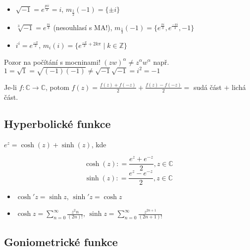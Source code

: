 \begin{example}
\begin{itemize}
    \item $\sqrt{-1}=e^{\frac{pi i}{2}}=i$,  $m_{\frac{1}{2}}(-1)=\{\pm i\}$
    \item $\sqrt[3]{-1}=e^{\frac{\pi i}{3}}$ (nesouhlasí s MA!),  $m_{\frac{1}{3}}(-1)=\{e^{\frac{\pi i}{3}},e^{\frac{-\pi i}{3}},-1\} $
    \item  $i^i=e^{\frac{-\pi }{2}}$, 
    $m_{i}(i)=\{e^{\frac{-\pi }{2}+2k\pi}\mid k\in\mathbb{Z}\}$
\end{itemize}

 \vspace{5mm}
 Pozor na počítání s mocninami! \newline
 $(zw)^{\alpha}\neq z^{\alpha}w^{\alpha}$ \newline
 např. $1=\sqrt{1}=\sqrt{(-1)(-1)}\neq \sqrt{-1}\sqrt{-1}=i^2=-1$
\end{example}

\begin{note}
Je-li $f \colon \mathbb{C} \to \mathbb{C}$, potom $f(z)=\frac{f(z)+f(-z)}{2}+\frac{f(z)-f(-z)}{2}=$ sudá část $+$ lichá část.
\end{note}

\subsection{Hyperbolické funkce}

$e^{z}=\cosh(z)+\sinh(z)$, kde

\begin{definition}
\[\cosh(z)\colon=\frac{e^{z}+e^{-z}}{2}, z\in \mathbb{C}\] \newline
\[\sinh(z)\colon=\frac{e^{z}-e^{-z}}{2}, z\in \mathbb{C}\]
\end{definition}


\begin{properties}
\begin{itemize}
    \item $\cosh'{z}=\sinh{z}$, $\sinh'{z}=\cosh{z}$
    \item $\cosh{z}=\sum_{n=0}^{\infty}\frac{z^2n}{(2n)!}$, $\sinh{z}=\sum_{n=0}^{\infty}\frac{z^{2n+1}}{(2n+1)!}$
\end{itemize}
\end{properties}

\subsection{Goniometrické funkce}


